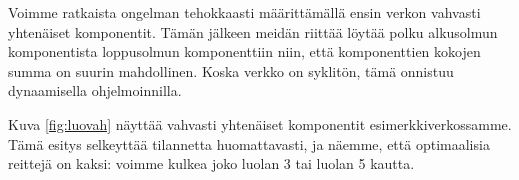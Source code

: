 Voimme ratkaista ongelman tehokkaasti määrittämällä ensin verkon
vahvasti yhtenäiset komponentit.
Tämän jälkeen meidän riittää löytää polku alkusolmun komponentista
loppusolmun komponenttiin niin, että komponenttien kokojen summa
on suurin mahdollinen.
Koska verkko on syklitön, tämä onnistuu dynaamisella ohjelmoinnilla.

Kuva \ref{fig:luovah} näyttää vahvasti yhtenäiset komponentit
esimerkkiverkossamme.
Tämä esitys selkeyttää tilannetta huomattavasti,
ja näemme, että optimaalisia reittejä on kaksi:
voimme kulkea joko luolan 3 tai luolan 5 kautta.